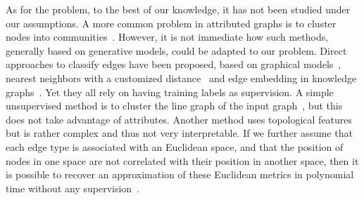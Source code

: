 As for the \ecp{} problem, to the best of our knowledge, it has not been studied under our
assumptions. A more common problem in attributed graphs is to cluster nodes into
communities~\autocites{LeskovecEgo12}{Yang2013}{Xu2014}{ZhangModelFree16}. However, it is not
immediate how such methods, generally based on generative models, could be adapted to our problem.
Direct approaches to classify edges have been proposed, based on graphical
models~\autocite{graphicalModelTies11}, nearest neighbors with a customized
distance~\autocite{Aggarwal2016a} and edge embedding in knowledge graphs~\autocite{transE13}. Yet
they all rely on having training labels as supervision. A simple unsupervised method is to cluster
the line graph of the input graph~\autocite{LineGraph09}, but this does not take advantage of
attributes. Another method uses topological features~\autocite{ahmed2017roles} but is rather complex
and thus not very interpretable. If we further assume that each edge type is associated with an
Euclidean space, and that the position of nodes in one space are not correlated with their position
in another space, then it is possible to recover an approximation of these Euclidean metrics in
polynomial time without any supervision~\autocite{Abraham2012a}.
